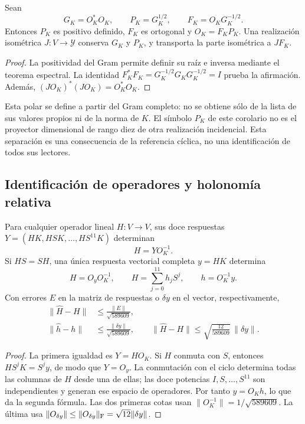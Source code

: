 \begin{corollary}
\label{md:antmem:k:polar}
Sean
\[
 G_K=O_K^*O_K,\qquad P_K=G_K^{1/2},\qquad
 F_K=O_KG_K^{-1/2}.
\]
Entonces \(P_K\) es positivo definido, \(F_K\) es ortogonal y
\(O_K=F_KP_K\). Una realización isométrica \(J:V\to\mathcal Y\)
conserva \(G_K\) y \(P_K\), y transporta la parte isométrica a
\(JF_K\).
\end{corollary}
\begin{proof}
La positividad del Gram permite definir su raíz e inversa mediante el
teorema espectral. La identidad
\(F_K^*F_K=G_K^{-1/2}G_KG_K^{-1/2}=I\) prueba la afirmación.
Además, \((JO_K)^*(JO_K)=O_K^*O_K\).
\end{proof}

Esta polar se define a partir del Gram completo: no se obtiene sólo de la
lista de sus valores propios ni de la norma de \(K\). El símbolo
\(P_K\) de este corolario no es el proyector dimensional de rango diez
de otra realización incidencial. Esta separación es una consecuencia de la
referencia cíclica, no una identificación de todos sus lectores.

\subsection{Identificación de operadores y holonomía relativa}
\label{md:antmem:k:identificacion}

\begin{theorem}
\label{md:antmem:k:operadores}
Para cualquier operador lineal \(H:V\to V\), sus doce respuestas
\(Y=(HK,HSK,\ldots,HS^{11}K)\) determinan
\[
 H=YO_K^{-1}.
\]
Si \(HS=SH\), una única respuesta vectorial completa \(y=HK\)
determina
\begin{equation}
 H=O_yO_K^{-1},\qquad
 H=\sum_{j=0}^{11}h_jS^j,\qquad h=O_K^{-1}y.
 \label{md:antmem:k:filtro}
\end{equation}
Con errores \(E\) en la matriz de respuestas o \(\delta y\) en el
vector, respectivamente,
\begin{align}
 \|\widehat H-H\|&\leq\frac{\|E\|}{\sqrt{589609}},
 \label{md:antmem:k:error-matriz}\\
 \|\widehat h-h\|&\leq\frac{\|\delta y\|}{\sqrt{589609}},\qquad
 \|\widehat H-H\|\leq\sqrt{\frac{12}{589609}}\,\|\delta y\|.
 \label{md:antmem:k:error-filtro}
\end{align}
\end{theorem}
\begin{proof}
La primera igualdad es \(Y=HO_K\). Si \(H\) conmuta con \(S\),
entonces \(HS^jK=S^jy\), de modo que \(Y=O_y\). La conmutación con
el ciclo determina todas las columnas de \(H\) desde una de ellas;
las doce potencias \(I,S,\ldots,S^{11}\) son independientes y generan
ese espacio de operadores. Por tanto \(y=O_Kh\), lo que da la
segunda fórmula. Las dos primeras cotas usan
\(\|O_K^{-1}\|=1/\sqrt{589609}\). La última usa
\(\|O_{\delta y}\|\leq\|O_{\delta y}\|_{\rm F}
=\sqrt{12}\|\delta y\|\).
\end{proof}

